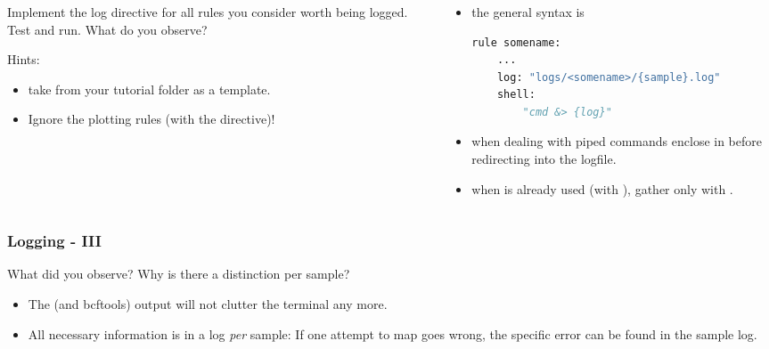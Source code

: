 \begin{frame}[fragile]
  \frametitle{}
  \begin{columns}
  	\begin{column}{0.5\textwidth}
  		\begin{task}
  			Implement the log directive for all rules you consider worth being logged. Test and run. What do you observe?
  		\end{task}
  	    \bcinfo Hints:
  	    \begin{itemize}
  	    	\item take  from your tutorial folder as a template.
  	    	\item \bcattention Ignore the plotting rules (with the  directive)!
  	    \end{itemize}
  	\end{column}
    \begin{column}{0.5\textwidth}
        \begin{itemize}
        	\item the general syntax is
        	      	\begin{lstlisting}[language=Python,style=Python]
rule somename:
    ...
    log: "logs/<somename>/{sample}.log"
    shell:
        "cmd &> {log}"
        	       \end{lstlisting}
            \item when dealing with piped commands enclose in   before redirecting into the logfile.
            \item when  is already used (with \altverb{>}), gather only  with .
        \end{itemize}
    \end{column}
  \end{columns}
\end{frame}

\begin{frame}[fragile]
  \frametitle{Logging - III}
  \begin{question}[Questions]
  	 What did you observe? Why is there a distinction per sample?
  \end{question}
  \pause
  \begin{docs}[Answers]
  	\begin{itemize}[<+->]
  		\item The  (and bcftools) output will not clutter the terminal any more. 
  		\item All necessary information is in a log \emph{per} sample: If one attempt to map goes wrong, the specific error can be found in the sample log.
  	\end{itemize}
  \end{docs}
\end{frame}

